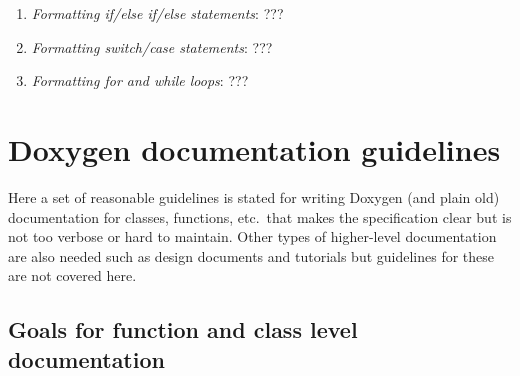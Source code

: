 \begin{enumerate}
{}\item\textit{Formatting if/else if/else statements}: ???

{}\item\textit{Formatting switch/case statements}: ???

{}\item\textit{Formatting for and while loops}: ???

\end{enumerate}

%
\section{Doxygen documentation guidelines}
%

Here a set of reasonable guidelines is stated for writing Doxygen (and plain
old) documentation for classes, functions, etc.\ that makes the specification
clear but is not too verbose or hard to maintain.  Other types of higher-level
documentation are also needed such as design documents and tutorials but
guidelines for these are not covered here.

%
\subsection{Goals for function and class level documentation}
%

